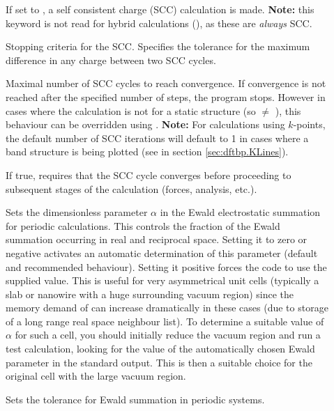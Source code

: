 \begin{description}
\item[] If set to , a self consistent charge (SCC)
  calculation is made. {\bf Note:} this keyword is not read for hybrid
  calculations (), as these are {\em always}
  SCC.
\item[] Stopping criteria for the SCC.  Specifies the
  tolerance for the maximum difference in any charge between two SCC
  cycles.

\item[] Maximal number of SCC cycles to reach
  convergence. If convergence is not reached after the specified
  number of steps, the program stops. However in cases where the
  calculation is not for a static structure (so  $\neq$
  \cb), this behaviour can be overridden using
  . {\bf Note:} For calculations using
  $k$-points, the default number of SCC iterations will default to 1
  in cases where a band structure is being plotted (see 
  in section \ref{sec:dftbp.KLines}).

\item[] If true, requires that the SCC cycle converges
  before proceeding to subsequent stages of the calculation (forces, analysis,
  etc.).

\item[] Sets the dimensionless parameter $\alpha$
  in the Ewald electrostatic summation for periodic calculations. This
  controls the fraction of the Ewald summation occurring in real and
  reciprocal space. Setting it to zero or negative activates an
  automatic determination of this parameter (default and recommended
  behaviour). Setting it positive forces the code to use the supplied
  value. This is useful for very asymmetrical unit cells
  (typically a slab or nanowire with a huge surrounding vacuum region)
  since the memory demand of \dftbp{} can increase dramatically in
  these cases (due to storage of a long range real space neighbour
  list). To determine a suitable value of $\alpha$ for such a cell,
  you should initially reduce the vacuum region and run a test
  calculation, looking for the value of the automatically chosen Ewald
  parameter in the standard output. This is then a suitable choice for
  the original cell with the large vacuum region.

\item[] Sets the tolerance for Ewald summation in periodic
  systems.


\end{description}
